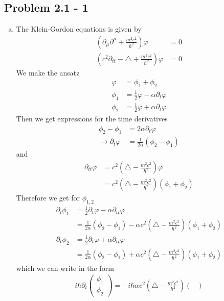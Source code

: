 \documentclass[10pt,a4paper]{book}
\theoremstyle{definition}
\begin{document}
\subsection{Problem 2.1 - 1}
\begin{enumerate}[(a)]
\item The Klein-Gordon equations is given by
\begin{align}
    \left(\partial_\mu\partial^\mu+\frac{m^2c^2}{\hbar^2}\right)\varphi&=0\\
    \left(c^2\partial_{tt}-\triangle+\frac{m^2c^2}{\hbar^2}\right)\varphi&=0
\end{align}
We make the ansatz
\begin{align}
    \varphi&=\phi_1+\phi_2\\
    \phi_1&=\frac{1}{2}\varphi-\alpha\partial_t\varphi\\
    \phi_2&=\frac{1}{2}\varphi+\alpha\partial_t\varphi
\end{align}
Then we get expressions for the time derivatives 
\begin{align}
    \phi_2-\phi_1&=2\alpha\partial_t\varphi\\
    \rightarrow\partial_t\varphi&=\frac{1}{2\alpha}(\phi_2-\phi_1)
\end{align}
and
\begin{align}
    \partial_{tt}\varphi&=c^2\left(\triangle-\frac{m^2c^2}{\hbar^2}\right)\varphi\\
    &=c^2\left(\triangle-\frac{m^2c^2}{\hbar^2}\right)(\phi_1+\phi_2)
\end{align}
Therefore we get for $\phi_{1,2}$
\begin{align}
    \partial_t\phi_1
    &=\frac{1}{2}\partial_t\varphi-\alpha\partial_{tt}\varphi\\
    &=\frac{1}{2\alpha}(\phi_2-\phi_1)-\alpha c^2\left(\triangle-\frac{m^2c^2}{\hbar^2}\right)(\phi_1+\phi_2)\\
    \partial_t\phi_2
    &=\frac{1}{2}\partial_t\varphi+\alpha\partial_{tt}\varphi\\
    &=\frac{1}{2\alpha}(\phi_2-\phi_1)+\alpha c^2\left(\triangle-\frac{m^2c^2}{\hbar^2}\right)(\phi_1+\phi_2)
\end{align}
which we can write in the form
\begin{align}
i\hbar\partial_t\begin{pmatrix}
\phi_1 \\
\phi_2 
\end{pmatrix}=-i\hbar\alpha c^2\left(\triangle-\frac{m^2c^2}{\hbar^2}\right)
\begin{pmatrix}

\end{pmatrix}
\end{align}
\end{enumerate}
\end{document}
